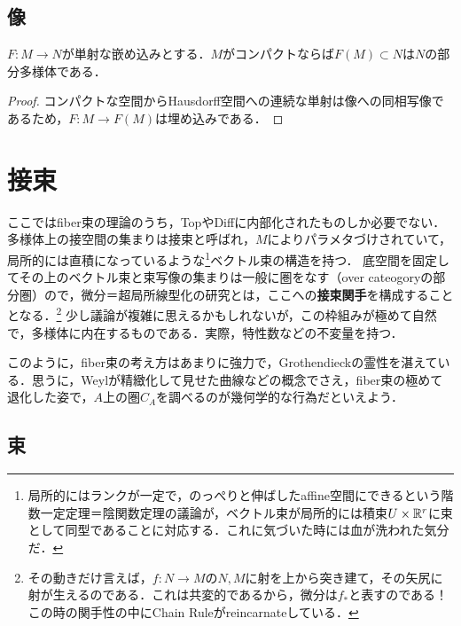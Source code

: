 \documentclass[uplatex,dvipdfmx]{jsreport}
\begin{document}
\subsection{像}

\begin{theorem}
    $F:M\to N$が単射な嵌め込みとする．$M$がコンパクトならば$F(M)\subset N$は$N$の部分多様体である．
\end{theorem}
\begin{proof}
    コンパクトな空間からHausdorff空間への連続な単射は像への同相写像であるため，$F:M\to F(M)$は埋め込みである．
\end{proof}

\section{接束}

\begin{tcolorbox}[colframe=ForestGreen, colback=ForestGreen!10!white,breakable,colbacktitle=ForestGreen!40!white,coltitle=black,fonttitle=\bfseries\sffamily,
title=Diff上のfiber束の理論：微積分学とは接束関手の研究である]
    ここではfiber束の理論のうち，TopやDiffに内部化されたものしか必要でない．
    多様体上の接空間の集まりは接束と呼ばれ，$M$によりパラメタづけされていて，局所的には直積になっているような\footnote{局所的にはランクが一定で，のっぺりと伸ばしたaffine空間にできるという階数一定定理＝陰関数定理の議論が，ベクトル束が局所的には積束$U\times\mathbb{R}^r$に束として同型であることに対応する．これに気づいた時には血が洗われた気分だ．}ベクトル束の構造を持つ．
    底空間を固定してその上のベクトル束と束写像の集まりは一般に圏をなす（over cateogoryの部分圏）ので，微分＝超局所線型化の研究とは，ここへの\textbf{接束関手}を構成することとなる．\footnote{その動きだけ言えば，$f:N\to M$の$N,M$に射を上から突き建て，その矢尻に射が生えるのである．これは共変的であるから，微分は$f_*$と表すのである！この時の関手性の中にChain Ruleがreincarnateしている．}
    少し議論が複雑に思えるかもしれないが，この枠組みが極めて自然で，多様体に内在するものである．実際，特性数などの不変量を持つ．

    このように，fiber束の考え方はあまりに強力で，Grothendieckの霊性を湛えている．思うに，Weylが精緻化して見せた曲線などの概念でさえ，fiber束の極めて退化した姿で，$A$上の圏$C_A$を調べるのが幾何学的な行為だといえよう．
\end{tcolorbox}

\subsection{束}
\end{document}
